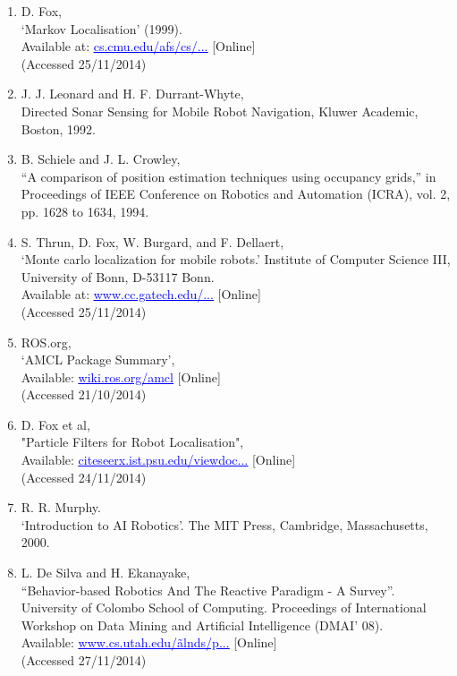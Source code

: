 \documentclass{article}
\begin{document}
\begin{multicols}{2}
\begin{enumerate}
\item D. Fox,
\\‘Markov Localisation’ (1999).
\\ Available at: \href{www.cs.cmu.edu/afs/cs/project/jair/pub/volume11/fox99a-html/node2.html}{\textcolor{blue}{\uline{cs.cmu.edu/afs/cs/...}}} [Online]
\\(Accessed 25/11/2014)

\item J. J. Leonard and H. F. Durrant-Whyte,
\\Directed Sonar Sensing for Mobile Robot Navigation, Kluwer Academic, Boston, 1992.

\item B. Schiele and J. L. Crowley,
\\“A comparison of position estimation techniques using occupancy grids,” in Proceedings of IEEE Conference on Robotics and Automation (ICRA), vol. 2, pp. 1628 to 1634, 1994.

\item S. Thrun, D. Fox, W. Burgard, and F. Dellaert, 
\\‘Monte carlo localization for mobile robots.’ Institute of Computer Science III, University of Bonn, D-53117 Bonn.
\\Available at: \href{www.cc.gatech.edu/~dellaert/pub/Dellaert99icra.pdf}{\textcolor{blue}{\uline{www.cc.gatech.edu/...}}} [Online]
\\(Accessed 25/11/2014)

\item ROS.org,
\\‘AMCL Package Summary’,
\\Available: \href{wiki.ros.org/amcl}{\textcolor{blue}{\uline{wiki.ros.org/amcl}}}  [Online]
\\(Accessed 21/10/2014)

\item D. Fox et al,
\\"Particle Filters for Robot Localisation",
\\Available: \href{citeseerx.ist.psu.edu/viewdoc...}{\textcolor{blue}{\uline{citeseerx.ist.psu.edu/viewdoc...}}} [Online]
\\(Accessed 24/11/2014)

\item R. R. Murphy.
\\‘Introduction to AI Robotics’. The MIT Press, Cambridge, Massachusetts, 2000.

\item L. De Silva and H. Ekanayake,
\\“Behavior-based Robotics And The Reactive Paradigm - A Survey”. University of Colombo School of Computing. Proceedings of International Workshop on Data Mining and Artificial Intelligence (DMAI’ 08).
\\Available: \href{www.cs.utah.edu/~alnds/papers/behavior_robotics_2008.pdf}{\textcolor{blue}{\uline{www.cs.utah.edu/\~alnds/p...}}} [Online]
\\(Accessed 27/11/2014)


\end{enumerate}
\end{multicols}
\end{document}
